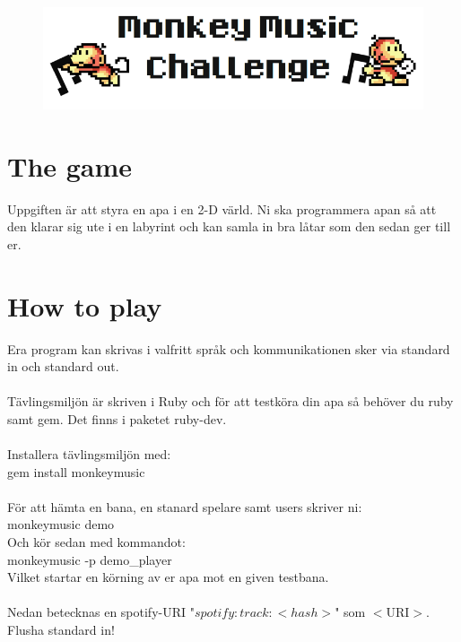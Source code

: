 \documentclass[a4paper, 10pt]{article}
\begin{document}
\begin{figure}
\centering
\includegraphics[scale=0.4]{logo}
\end{figure}
\newpage
\section*{The game}
Uppgiften är att styra en apa i en 2-D värld. Ni ska programmera apan så att den klarar sig ute i en labyrint och kan samla in bra låtar som den  sedan ger till er. \\
\section*{How to play}
Era program kan skrivas i valfritt språk och kommunikationen sker via standard in och standard out. \\\\
Tävlingsmiljön är skriven i Ruby och för att testköra din apa så behöver du ruby samt gem. Det finns i paketet ruby-dev. \\\\
Installera tävlingsmiljön med: \\ gem install monkeymusic \\\\
För att hämta en bana, en stanard spelare samt users skriver ni: \\
monkeymusic demo \\
Och kör sedan med kommandot: \\
monkeymusic -p demo\_player \\
Vilket startar en körning av er apa mot en given testbana. \\\\
Nedan betecknas en spotify-URI "$spotify:track:<hash>$" som $<$URI$>$.
\\
Flusha standard in! 
\newpage
\end{document}
